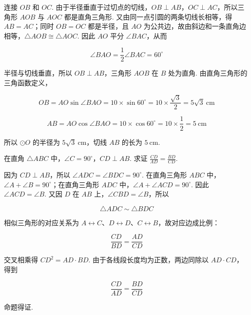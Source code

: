 \begin{solution}

连接 \(OB\) 和 \(OC\). 由于半径垂直于过切点的切线，\(OB\perp AB\)，\(OC\perp AC\)，所以三角形 \(AOB\) 与 \(AOC\) 都是直角三角形. 又由同一点引圆的两条切线长相等，得 \(AB=AC\)；同时 \(OB=OC\) 都是半径，且 \(AO\) 为公共边，故由斜边和一条直角边相等，\(\triangle AOB\cong\triangle AOC\). 因此 \(AO\) 平分 \(\angle BAC\)，从而

\[
\angle BAO=\frac{1}{2}\angle BAC=60^\circ
\]

半径与切线垂直，所以 \(OB\perp AB\)，三角形 \(AOB\) 在 \(B\) 处为直角. 由直角三角形的三角函数定义，

\[
OB=AO\sin\angle BAO=10\times\sin60^\circ=10\times\frac{\sqrt{3}}{2}=5\sqrt{3}\mathrm{~cm}
\]

\[
AB=AO\cos\angle BAO=10\times\cos60^\circ=10\times\frac{1}{2}=5\mathrm{~cm}
\]

所以 \(\odot O\) 的半径为 \(5\sqrt{3}\mathrm{~cm}\)，切线 \(AB\) 的长为 \(5\mathrm{~cm}\).
\end{solution}

\begin{problem}
在直角 \(\triangle ABC\) 中，\(\angle C=90^\circ\)，\(CD\perp AB\). 求证 \( \frac{CD}{AD}=\frac{BD}{CD} \).
\end{problem}

\begin{solution}

因为 \(CD\perp AB\)，所以 \(\angle ADC=\angle BDC=90^\circ\). 在直角三角形 \(ABC\) 中，\(\angle A+\angle B=90^\circ\)；在直角三角形 \(ADC\) 中，\(\angle A+\angle ACD=90^\circ\). 因此 \(\angle ACD=\angle B\). 又因 \(D\) 在 \(AB\) 上，\(\angle CBD=\angle B\)，所以

\[
\triangle ADC\sim\triangle BDC
\]

相似三角形的对应关系为 \(A\leftrightarrow C\)、\(D\leftrightarrow D\)、\(C\leftrightarrow B\)，故对应边成比例：

\[
\frac{CD}{BD}=\frac{AD}{CD}
\]

交叉相乘得 \(CD^2=AD\cdot BD\). 由于各线段长度均为正数，两边同除以 \(AD\cdot CD\)，得到

\[
\frac{CD}{AD}=\frac{BD}{CD}
\]

命题得证.
\end{solution}

